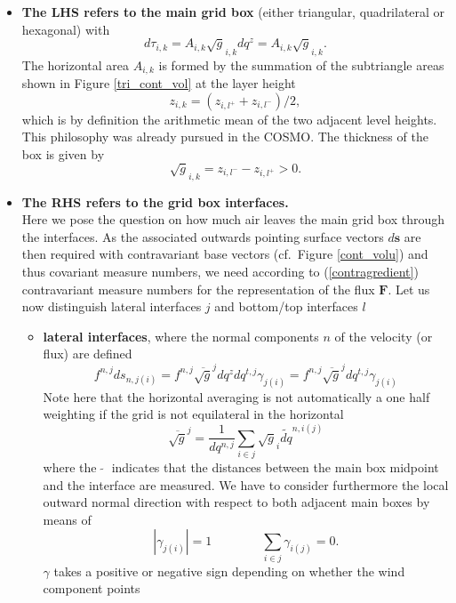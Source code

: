 \begin{itemize}
  \item \textbf{The LHS refers to the main grid box} (either triangular, quadrilateral or hexagonal) with
 $$d\tau_{i,k} = A_{i,k}\sqrt{g}_{i,k}dq^z=A_{i,k}\sqrt{g}_{i,k}.$$ The horizontal area $A_{i,k}$
 is formed by the summation of the subtriangle areas shown in Figure \ref{tri_cont_vol} at the layer
 height
 $$z_{i,k}=({z_{i,l^+}+z_{i,l^-}})/2,$$ which is by definition the arithmetic mean of the two adjacent
 level heights. This philosophy was already pursued in the COSMO. The thickness of the box is given by
 $$\sqrt{g}_{i,k}=z_{i,l^-}-z_{i,l^+}>0.$$
 \item \textbf{The RHS refers to the grid box interfaces.}\\
Here we pose the question on how much air leaves the main grid box through the interfaces.
As the associated outwards pointing surface vectors $d\mathbf{s}$ are then required with contravariant base vectors (cf.~Figure \ref{cont_volu}) and thus covariant measure numbers, we need according to (\ref{contragredient}) contravariant measure numbers for the representation of the flux $\mathbf{F}$.
Let us now distinguish lateral interfaces $j$ and bottom/top interfaces $l$
 \begin{itemize}
   \item \textbf{lateral interfaces}, where the normal components $n$ of the velocity (or flux) are defined
         \begin{displaymath}
         f^{n,j}ds_{n,j(i)} = f^{n,j}\overline{\sqrt{g}}^jdq^zdq^{t,j}\gamma_{j(i)}=
                              f^{n,j}\overline{\sqrt{g}}^jdq^{t,j}\gamma_{j(i)}
         \end{displaymath}
         Note here that the horizontal averaging is not automatically a one half weighting if the grid is
         not equilateral in the horizontal
         \begin{displaymath}
         \overline{\sqrt{g}}^j=\frac{1}{dq^{n,j}}\sum_{i\in j}\sqrt{g}_i
                                   \widetilde{dq}^{n,i(j)}
         \end{displaymath}
         where the $\widetilde{\;\;}$ indicates that the distances between the main box midpoint and the
         interface are measured.
         We have to consider furthermore the local outward
         normal direction with respect to both adjacent main boxes by means of 
         $$|\gamma_{j(i)}|=1\qquad\qquad \sum_{i\in j}\gamma_{i(j)}=0.$$
         $\gamma$ takes a positive or negative sign depending on whether the wind component points

\end{itemize}
\end{itemize}
